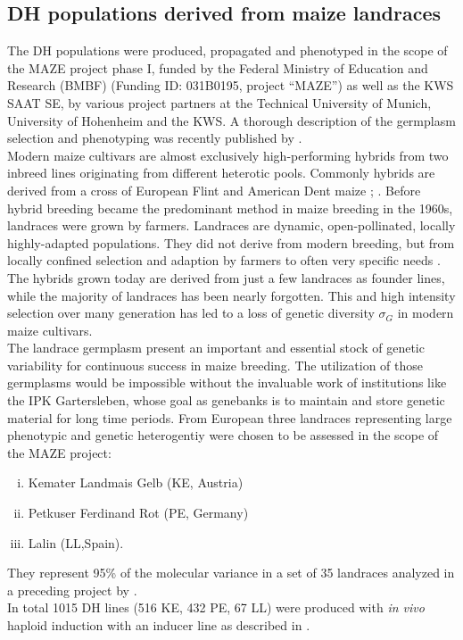 \subsection{DH populations derived from maize landraces}
The DH populations were produced, propagated and phenotyped in the scope of the MAZE
project phase I, funded by the Federal Ministry of Education and Research (BMBF) (Funding
ID: 031B0195, project “MAZE”) as well as the KWS SAAT SE, by various project partners at
the Technical University of Munich, University of Hohenheim and the KWS. A thorough
description of the germplasm selection and phenotyping was recently published by
\cite{holker2019european}. \\
Modern maize cultivars are almost exclusively high-performing hybrids from two inbreed
lines originating from different heterotic pools. Commonly hybrids are derived from a
cross of European Flint and American Dent maize \cite{dos2004priori};
\cite{brauner2019testcross}. Before hybrid breeding became the predominant method in maize
breeding in the 1960s, landraces were grown by farmers. Landraces are dynamic,
open-pollinated, locally highly-adapted populations. They did not derive from modern
breeding, but from locally confined selection and adaption by farmers to often very
specific needs \cite{arteaga2016genomic}. The hybrids grown today are derived from just a
few landraces as founder lines, while the majority of landraces has been nearly
forgotten. This and high intensity selection over many generation has led to a loss of
genetic diversity $\sigma_G$ in modern maize cultivars.\\
The landrace germplasm present an important and essential stock of genetic variability for
continuous success in maize breeding. The utilization of those germplasms would be
impossible without the invaluable work of institutions like the IPK Gartersleben, whose goal
as genebanks is to maintain and store genetic material for long time periods. From European
three landraces representing large phenotypic and genetic heterogentiy were chosen to be assessed in the scope of the MAZE project:
\begin{enumerate}[(i)]
\item  Kemater Landmais Gelb (KE, Austria)
\item Petkuser Ferdinand Rot (PE, Germany)
\item Lalin (LL,Spain).
\end{enumerate}

They represent 95\% of the molecular variance in a set of
35 landraces analyzed in a preceding project by \cite{mayer2017there}.\\
In total 1015 DH lines (516 KE, 432 PE, 67 LL) were produced with \textit{in vivo} haploid
induction with an inducer line as described in \cite{roeber2005vivo}.


